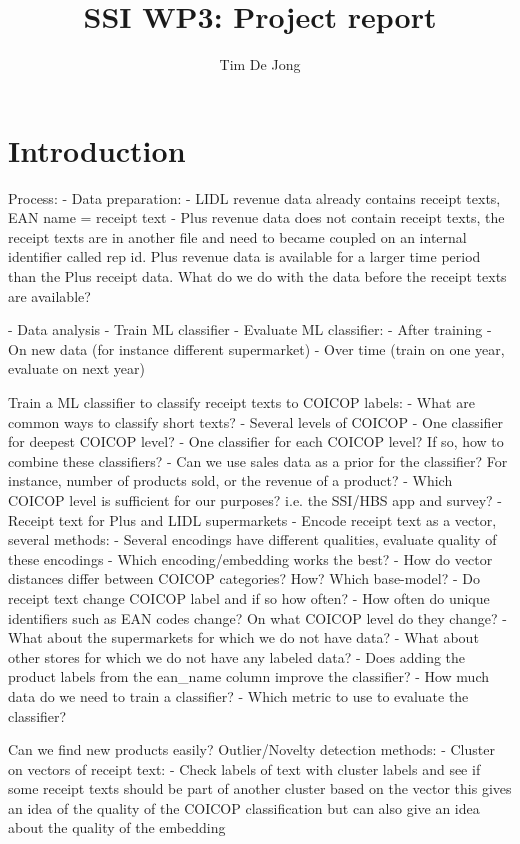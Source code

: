 \documentclass{article}
\title{SSI WP3: Project report}
\author{Tim De Jong}
\begin{document}
\maketitle


\section{Introduction}

Process:
- Data preparation:
    - LIDL revenue data already contains receipt texts, EAN name = receipt text
    - Plus revenue data does not contain receipt texts, the receipt texts are in another file and need to became
    coupled on an internal identifier called rep id. Plus revenue data is available for a larger time period than the
    Plus receipt data. What do we do with the data before the receipt texts are available?

- Data analysis
- Train ML classifier
- Evaluate ML classifier:
    - After training
    - On new data (for instance different supermarket)
    - Over time (train on one year, evaluate on next year)




Train a ML classifier to classify receipt texts to COICOP labels:
- What are common ways to classify short texts?
- Several levels of COICOP
    - One classifier for deepest COICOP level?
    - One classifier for each COICOP level? If so, how to combine these classifiers?
    - Can we use sales data as a prior for the classifier? For instance, number of products sold, 
    or the revenue of a product?
    - Which COICOP level is sufficient for our purposes? i.e. the SSI/HBS app and survey?
- Receipt text for Plus and LIDL supermarkets
- Encode receipt text as a vector, several methods: 
    - Several encodings have different qualities, evaluate quality of these encodings
    - Which encoding/embedding works the best?
    - How do vector distances differ between COICOP categories? How? Which base-model?
- Do receipt text change COICOP label and if so how often?
- How often do unique identifiers such as EAN codes change? On what COICOP level do they change?
- What about the supermarkets for which we do not have data? 
- What about other stores for which we do not have any labeled data?
- Does adding the product labels from the ean\_name column improve the classifier?
- How much data do we need to train a classifier?
- Which metric to use to evaluate the classifier?
    
Can we find new products easily? Outlier/Novelty detection methods:    
    - Cluster on vectors of receipt text:
        - Check labels of text with cluster labels and see if some receipt texts should be part of another cluster based on the vector
        this gives an idea of the quality of the COICOP classification but can also give an idea about the quality of the embedding
\end{document}
